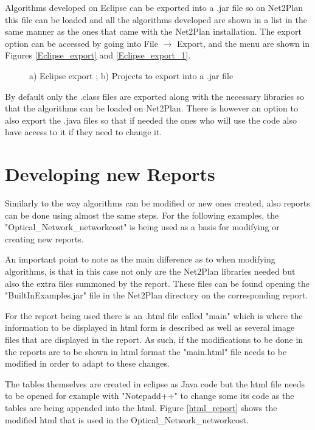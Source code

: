\documentclass[12pt, a4paper]{article}
\begin{document}
	Algorithms developed on Eclipse can be exported into a .jar file so on Net2Plan this file can be loaded and all the algorithms developed are shown in a list in the same manner as the ones that came with the Net2Plan installation. The export option can be accessed by going into File $\rightarrow$ Export, and the menu are shown in Figures \ref{Eclipse_export} and \ref{Eclipse_export_1}.
	
	\begin{figure}[!h]
		\centering
		\caption{a) Eclipse export ; b) Projects to export into a .jar file}
	\end{figure}
	
	By default only the .class files are exported along with the necessary libraries so that the algorithms can be loaded on Net2Plan. There is however an option to also export the .java files so that if needed the ones who will use the code also have access to it if they need to change it.
	 						
	\newpage

	\section{Developing new Reports}
	Similarly to the way algorithms can be modified or new ones created, also reports can be done using almost the same steps. For the following examples, the "Optical\_Network\_networkcost" is being used as a basis for modifying or creating new reports.

	An important point to note as the main difference as to when modifying algorithms, is that in this case not only are the Net2Plan libraries needed but also the extra files summoned by the report. These files can be found opening the "BuiltInExamples.jar" file in the Net2Plan directory on the corresponding report.

	For the report being used there is an .html file called "main" which is where the information to be displayed in html form is described as well as several image files that are displayed in the report. As such, if the modifications to be done in the reports are to be shown in html format the "main.html" file needs to be modified in order to adapt to these changes.
	
	The tables themselves are created in eclipse as Java code but the html file needs to be opened for example with "Notepadd++" to change some its code as the tables are being appended into the html. Figure \ref{html_report} shows the modified html that is used in the Optical\_Network\_networkcost.
	
\end{document}
